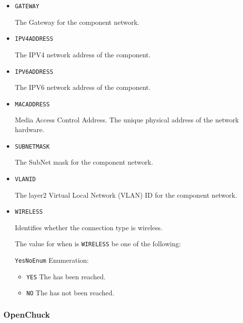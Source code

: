 \begin{itemize}

\item \texttt{GATEWAY}


The Gateway for the component network.

\item \texttt{IPV4\textunderscore ADDRESS}


The IPV4 network address of the component.


\item \texttt{IPV6\textunderscore ADDRESS}


The IPV6 network address of the component.


\item \texttt{MAC\textunderscore ADDRESS}


Media Access Control Address. The unique physical address of the network hardware.


\item \texttt{SUBNET\textunderscore MASK}


The SubNet mask for the component network.


\item \texttt{VLAN\textunderscore ID}


The layer2 Virtual Local Network (VLAN) ID for the component network.

\item \texttt{WIRELESS}


Identifies whether the connection type is wireless.


The value for  when  is \texttt{WIRELESS} \MUST be one of the following: 


\texttt{YesNoEnum} Enumeration:

\begin{itemize}
\item \texttt{YES} \newline The  has been reached. 
\item \texttt{NO} \newline The  has not been reached. 
\end{itemize}


\end{itemize}

\subsubsection{OpenChuck}
\label{sec:OpenChuck}



